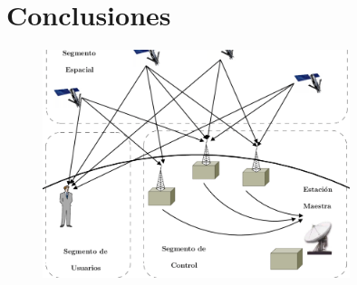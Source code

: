 \documentclass[12pt,twoside]{rif}
\begin{document}
	\section{Conclusiones}
\begin{center}
\begin{figure}
\includegraphics[width=0.8\textwidth]{img/GPS.png}
\end{figure}
\end{center}
	\nocite{*}
	
	
	
\end{document}
